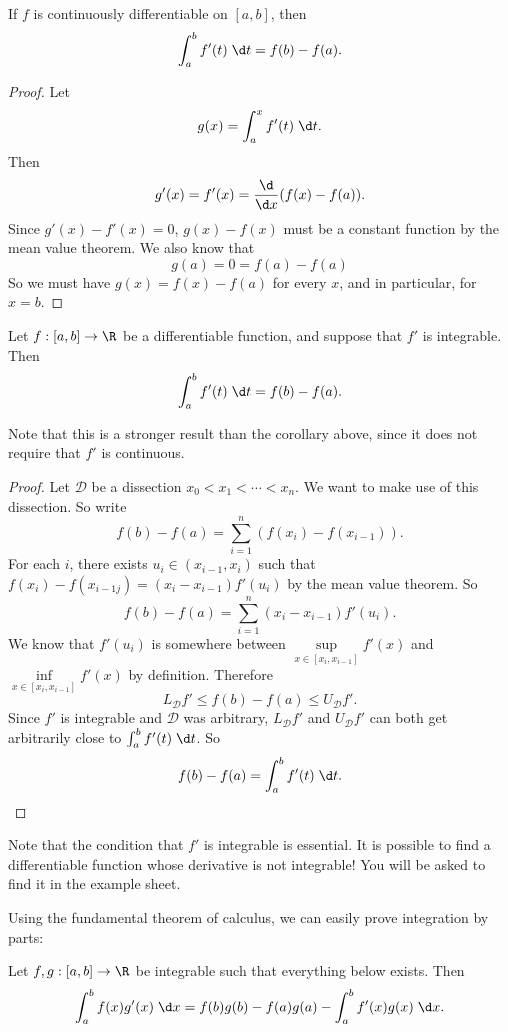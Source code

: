 \documentclass[a4paper]{article}
\begin{document}
\begin{cor}
  If $f$ is continuously differentiable on $[a, b]$, then
  \[
    \int_a^b f'(t)\;\d t = f(b) - f(a).
  \]
\end{cor}

\begin{proof}
  Let
  \[
    g(x) = \int_a^x f'(t)\;\d t.
  \]
  Then
  \[
    g'(x) = f'(x) = \frac{\d }{\d x}(f(x) - f(a)).
  \]
  Since $g'(x) - f'(x) = 0$, $g(x) - f(x)$ must be a constant function by the mean value theorem. We also know that
  \[
    g(a) = 0 = f(a) - f(a)
  \]
  So we must have $g(x) = f(x) - f(a)$ for every $x$, and in particular, for $x = b$.
\end{proof}

\begin{thm}
  Let $f: [a, b] \to \R$ be a differentiable function, and suppose that $f'$ is integrable. Then
  \[
    \int_a^b f'(t)\;\d t = f(b) - f(a).
  \]
\end{thm}
Note that this is a stronger result than the corollary above, since it does not require that $f'$ is continuous.

\begin{proof}
  Let $\mathcal{D}$ be a dissection $x_0 < x_1 < \cdots < x_n$. We want to make use of this dissection. So write
  \[
    f(b) - f(a) = \sum_{i = 1}^n (f(x_i) - f(x_{i - 1})).
  \]
  For each $i$, there exists $u_i\in (x_{i - 1}, x_i)$ such that $f(x_i) - f(x_{i - 1j}) = (x_i - x_{i - 1})f'(u_i)$ by the mean value theorem. So
  \[
    f(b) - f(a) = \sum_{i = 1}^n (x_i - x_{i - 1})f'(u_i).
  \]
  We know that $f'(u_i)$ is somewhere between $\sup\limits_{x\in[x_i, x_{i - 1}]}f'(x)$ and $\inf\limits_{x\in[x_i, x_{i - 1}]}f'(x)$ by definition. Therefore
  \[
    L_\mathcal{D} f' \leq f(b) - f(a) \leq U_\mathcal{D} f'.
  \]
  Since $f'$ is integrable and $\mathcal{D}$ was arbitrary, $L_\mathcal{D}f'$ and $U_\mathcal{D}f'$ can both get arbitrarily close to $\int_a^b f'(t)\;\d t$. So
  \[
    f(b) - f(a) = \int_a^b f'(t)\;\d t.
  \]
\end{proof}
Note that the condition that $f'$ is integrable is essential. It is possible to find a differentiable function whose derivative is not integrable! You will be asked to find it in the example sheet.

Using the fundamental theorem of calculus, we can easily prove integration by parts:
\begin{thm}
  Let $f, g:[a, b]\to \R$ be integrable such that everything below exists. Then
  \[
    \int_a^b f(x)g'(x)\;\d x = f(b)g(b) - f(a)g(a) - \int_a^b f'(x)g(x)\;\d x.
  \]
\end{thm}
\end{document}
